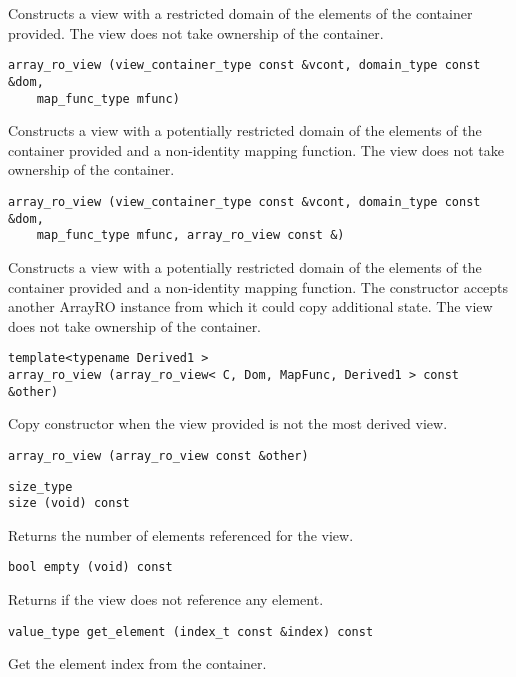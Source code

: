 Constructs a view with a restricted domain of the elements of the container provided. The view does not take ownership of the container.

\begin{verbatim}
array_ro_view (view_container_type const &vcont, domain_type const &dom,
    map_func_type mfunc)
\end{verbatim}

Constructs a view with a potentially restricted domain of the elements of the container provided and a non-identity mapping function. The view does not take ownership of the container.

\begin{verbatim}
array_ro_view (view_container_type const &vcont, domain_type const &dom,
    map_func_type mfunc, array_ro_view const &)
\end{verbatim}

Constructs a view with a potentially restricted domain of the elements of the container provided and a non-identity mapping function. The constructor accepts another ArrayRO instance from which it could copy additional state. The view does not take ownership of the container.

\begin{verbatim}
template<typename Derived1 >
array_ro_view (array_ro_view< C, Dom, MapFunc, Derived1 > const &other)
\end{verbatim}

Copy constructor when the view provided is not the most derived view.

\begin{verbatim}
array_ro_view (array_ro_view const &other)
\end{verbatim}

\begin{verbatim}
size_type
size (void) const
\end{verbatim}

Returns the number of elements referenced for the view.

\begin{verbatim}
bool empty (void) const
\end{verbatim}

Returns if the view does not reference any element.

\begin{verbatim}
value_type get_element (index_t const &index) const
\end{verbatim}

Get the element index from the container.

